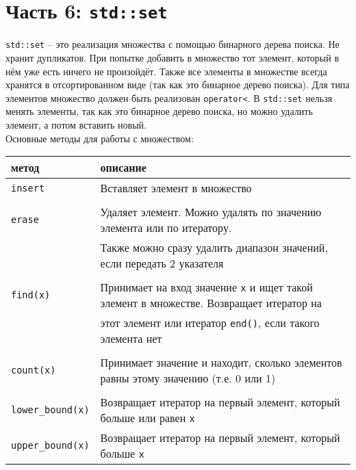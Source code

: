 \documentclass{article}
\begin{document}
\newpage
\section*{Часть 6: \texttt{std::set}}
\texttt{std::set} -- это реализация множества с помощью бинарного дерева поиска. Не хранит дупликатов. При попытке добавить в множество тот элемент, который в нём уже есть ничего не произойдёт. Также все элементы в множестве всегда хранятся в отсортированном виде (так как это бинарное дерево поиска). Для типа элементов множество должен быть реализован \texttt{operator<}. В \texttt{std::set} нельзя менять элементы, так как это бинарное дерево поиска, но можно удалить элемент, а потом вставить новый.\\

Основные методы для работы с множеством:
\begin{center}
\begin{tabular}{ l | l }
 метод & описание \\ \hline
 \texttt{insert}  & Вставляет элемент в множество\\ \\\hline
 \texttt{erase}   & Удаляет элемент. Можно удалять по значению элемента или по итератору.  \\ 
                  & Также можно сразу удалить диапазон значений, если передать 2 указателя \\\\ \hline
 \texttt{find(x)} & Принимает на вход значение \texttt{x} и ищет такой элемент в множестве. Возвращает итератор на \\
                  &  этот элемент или итератор \texttt{end()}, если такого элемента нет\\ \\ \hline
 \texttt{count(x)}  & Принимает значение и находит, сколько элементов равны этому значению (т.е. 0 или 1) \\ \\\hline
 \texttt{lower\_bound(x)}  & Возвращает итератор на первый элемент, который больше или равен \texttt{x} \\
 \texttt{upper\_bound(x)}  & Возвращает итератор на первый элемент, который больше \texttt{x} \\
\end{tabular}
\end{center}
\end{document}
